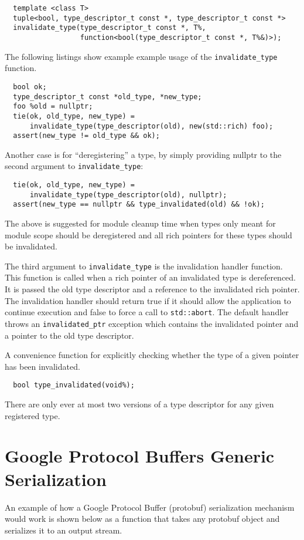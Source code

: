 \documentclass[10pt,a4paper]{article}
\begin{document}
\begin{verbatim}
  template <class T>
  tuple<bool, type_descriptor_t const *, type_descriptor_t const *>
  invalidate_type(type_descriptor_t const *, T%,
                  function<bool(type_descriptor_t const *, T%&)>);
\end{verbatim}

The following listings show example example usage of the \verb+invalidate_type+
function.

\begin{verbatim}
  bool ok;
  type_descriptor_t const *old_type, *new_type;
  foo %old = nullptr;
  tie(ok, old_type, new_type) =
      invalidate_type(type_descriptor(old), new(std::rich) foo);
  assert(new_type != old_type && ok);
\end{verbatim}

Another case is for ``deregistering'' a type, by simply providing nullptr to the
second argument to \verb+invalidate_type+:

\begin{verbatim}
  tie(ok, old_type, new_type) =
      invalidate_type(type_descriptor(old), nullptr);
  assert(new_type == nullptr && type_invalidated(old) && !ok);
\end{verbatim}

The above is suggested for module cleanup time when types only meant for module
scope should be deregistered and all rich pointers for these types should be
invalidated.

The third argument to \verb+invalidate_type+ is the invalidation handler
function. This function is called when a rich pointer of an invalidated type is
dereferenced. It is passed the old type descriptor and a reference to the
invalidated rich pointer.  The invalidation handler should return true if it
should allow the application to continue execution and false to force a call to
\verb+std::abort+. The default handler throws an \verb+invalidated_ptr+
exception which contains the invalidated pointer and a pointer to the old type
descriptor.

A convenience function for explicitly checking whether the type of a given
pointer has been invalidated.

\begin{verbatim}
  bool type_invalidated(void%);
\end{verbatim}

There are only ever at most two versions of a type descriptor for any given
registered type.

\section{Google Protocol Buffers Generic Serialization}
\label{appendix:protobuf-example}
An example of how a Google Protocol Buffer (protobuf) serialization mechanism
would work is shown below as a function that takes any protobuf object and
serializes it to an output stream.
\end{document}
